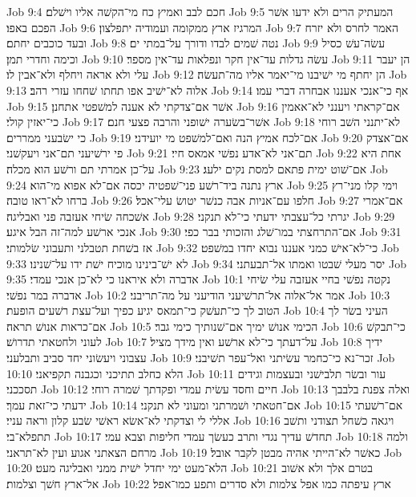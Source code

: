 Job 9:4  חכם לבב ואמיץ כח מי־הקשׁה אליו וישׁלם׃
Job 9:5  המעתיק הרים ולא ידעו אשׁר הפכם באפו׃
Job 9:6  המרגיז ארץ ממקומה ועמודיה יתפלצון׃
Job 9:7  האמר לחרס ולא יזרח ובעד כוכבים יחתם׃
Job 9:8  נטה שׁמים לבדו ודורך על־במתי ים׃
Job 9:9  עשׂה־עשׁ כסיל וכימה וחדרי תמן׃
Job 9:10  עשׂה גדלות עד־אין חקר ונפלאות עד־אין מספר׃
Job 9:11  הן יעבר עלי ולא אראה ויחלף ולא־אבין לו׃
Job 9:12  הן יחתף מי ישׁיבנו מי־יאמר אליו מה־תעשׂה׃
Job 9:13  אלוה לא־ישׁיב אפו תחתו שׁחחו עזרי רהב׃
Job 9:14  אף כי־אנכי אעננו אבחרה דברי עמו׃
Job 9:15  אשׁר אם־צדקתי לא אענה למשׁפטי אתחנן׃
Job 9:16  אם־קראתי ויענני לא־אאמין כי־יאזין קולי׃
Job 9:17  אשׁר־בשׂערה ישׁופני והרבה פצעי חנם׃
Job 9:18  לא־יתנני השׁב רוחי כי ישׂבעני ממררים׃
Job 9:19  אם־לכח אמיץ הנה ואם־למשׁפט מי יועידני׃
Job 9:20  אם־אצדק פי ירשׁיעני תם־אני ויעקשׁני׃
Job 9:21  תם־אני לא־אדע נפשׁי אמאס חיי׃
Job 9:22  אחת היא על־כן אמרתי תם ורשׁע הוא מכלה׃
Job 9:23  אם־שׁוט ימית פתאם למסת נקים ילעג׃
Job 9:24  ארץ נתנה ביד־רשׁע פני־שׁפטיה יכסה אם־לא אפוא מי־הוא׃
Job 9:25  וימי קלו מני־רץ ברחו לא־ראו טובה׃
Job 9:26  חלפו עם־אניות אבה כנשׁר יטושׂ עלי־אכל׃
Job 9:27  אם־אמרי אשׁכחה שׂיחי אעזבה פני ואבליגה׃
Job 9:28  יגרתי כל־עצבתי ידעתי כי־לא תנקני׃
Job 9:29  אנכי ארשׁע למה־זה הבל איגע׃
Job 9:30  אם־התרחצתי במו־שׁלג והזכותי בבר כפי׃
Job 9:31  אז בשׁחת תטבלני ותעבוני שׂלמותי׃
Job 9:32  כי־לא־אישׁ כמני אעננו נבוא יחדו במשׁפט׃
Job 9:33  לא ישׁ־בינינו מוכיח ישׁת ידו על־שׁנינו׃
Job 9:34  יסר מעלי שׁבטו ואמתו אל־תבעתני׃
Job 9:35  אדברה ולא איראנו כי לא־כן אנכי עמדי׃
Job 10:1  נקטה נפשׁי בחיי אעזבה עלי שׂיחי אדברה במר נפשׁי׃
Job 10:2  אמר אל־אלוה אל־תרשׁיעני הודיעני על מה־תריבני׃
Job 10:3  הטוב לך כי־תעשׁק כי־תמאס יגיע כפיך ועל־עצת רשׁעים הופעת׃
Job 10:4  העיני בשׂר לך אם־כראות אנושׁ תראה׃
Job 10:5  הכימי אנושׁ ימיך אם־שׁנותיך כימי גבר׃
Job 10:6  כי־תבקשׁ לעוני ולחטאתי תדרושׁ׃
Job 10:7  על־דעתך כי־לא ארשׁע ואין מידך מציל׃
Job 10:8  ידיך עצבוני ויעשׂוני יחד סביב ותבלעני׃
Job 10:9  זכר־נא כי־כחמר עשׂיתני ואל־עפר תשׁיבני׃
Job 10:10  הלא כחלב תתיכני וכגבנה תקפיאני׃
Job 10:11  עור ובשׂר תלבישׁני ובעצמות וגידים תסככני׃
Job 10:12  חיים וחסד עשׂית עמדי ופקדתך שׁמרה רוחי׃
Job 10:13  ואלה צפנת בלבבך ידעתי כי־זאת עמך׃
Job 10:14  אם־חטאתי ושׁמרתני ומעוני לא תנקני׃
Job 10:15  אם־רשׁעתי אללי לי וצדקתי לא־אשׂא ראשׁי שׂבע קלון וראה עניי׃
Job 10:16  ויגאה כשׁחל תצודני ותשׁב תתפלא־בי׃
Job 10:17  תחדשׁ עדיך נגדי ותרב כעשׂך עמדי חליפות וצבא עמי׃
Job 10:18  ולמה מרחם הצאתני אגוע ועין לא־תראני׃
Job 10:19  כאשׁר לא־הייתי אהיה מבטן לקבר אובל׃
Job 10:20  הלא־מעט ימי יחדל ישׁית ממני ואבליגה מעט׃
Job 10:21  בטרם אלך ולא אשׁוב אל־ארץ חשׁך וצלמות׃
Job 10:22  ארץ עיפתה כמו אפל צלמות ולא סדרים ותפע כמו־אפל׃
